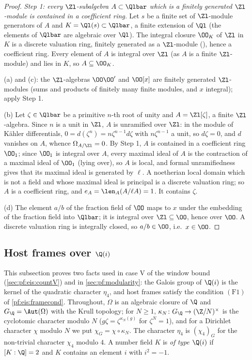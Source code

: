 \begin{proof}
\emph{Step 1: every $\Zl$-subalgebra $A\subset\Qlbar$ which is a finitely generated $\Zl$-module is contained in a coefficient ring.}
Let $s$ be a finite set of $\Zl$-module generators of $A$ and $K=\Ql(s)\subset\Qlbar$, a finite extension of $\Ql$ (the elements of
$\Qlbar$ are algebraic over $\Ql$). The integral closure $\OO_K$ of $\Zl$ in $K$ is a discrete valuation ring, finitely generated as a
$\Zl$-module (\cite[Ch.~II, \S2]{Serre1979}), hence a coefficient ring. Every element of $A$ is integral over
$\Zl$ (as $A$ is a finite $\Zl$-module) and lies in $K$, so $A\subseteq\OO_K$.

(a) and (c): the $\Zl$-algebras $\OO\OO'$ and $\OO[x]$ are finitely generated $\Zl$-modules (sums and products of finitely many finite
modules, and $x$ integral); apply Step 1.

(b) Let $\zeta\in\Qlbar$ be a primitive $n$-th root of unity and $A=\Zl[\zeta]$, a finite $\Zl$-algebra. Since $n$ is a unit in $\Zl$,
$A$ is unramified over $\Zl$: in the module of K\"ahler differentials, $0=d(\zeta^n)=n\zeta^{n-1}d\zeta$ with $n\zeta^{n-1}$ a unit, so
$d\zeta=0$, and $d$ vanishes on $A$, whence $\Omega_{A/\Zl}=0$. By Step 1, $A$ is contained in a coefficient ring $\OO_1$; since
$\OO_1$ is integral over $A$, every maximal ideal of $A$ is the contraction of a maximal ideal of $\OO_1$ (lying over), so $A$ is
local, and formal unramifiedness gives that its maximal ideal is generated by $\ell$. A noetherian local domain which is not a field and whose maximal ideal is principal is a discrete
valuation ring; so $A$ is a coefficient ring, and $e_A=\len_A(A/\ell A)=1$. It contains $\zeta$.

(d) The element $a/b$ of the fraction field of $\OO$ maps to $x$ under the embedding of the fraction field into $\Qlbar$; it is
integral over $\Zl\subseteq\OO$, hence over $\OO$. A discrete valuation ring is integrally closed, so $a/b\in\OO$, i.e.\ $x\in\OO$.
\end{proof}

\subsection{Host frames over \texorpdfstring{$\Q(i)$}{Q(i)}}\label{sec:pf:sh-misc:frames}

This subsection proves two facts used in case V of the window bound (\cref{sec:pf:eis:countV}) and in
\cref{sec:pf:modularity}: the Galois group of $\Q(i)$ is the kernel of the quadratic character $\eta_4$, and host frames satisfy the
condition $(\mathrm{F1})$ of \cref{pf:eis:framecond}. Throughout, $\Omega$ is an algebraic closure of $\Q$ and $G_\Q=\Aut(\Omega)$ with the
Krull topology; for $N\ge1$, $\kappa_N\colon G_\Q\to(\Z/N)^\times$ is the cyclotomic character modulo $N$ ($g\zeta=\zeta^{\kappa_N(g)}$ for
$\zeta^N=1$), and for a Dirichlet character $\chi$ modulo $N$ we put $\chi_G=\chi\circ\kappa_N$. The character $\eta_4$ is $(\chi_4)_G$ for the
non-trivial character $\chi_4$ modulo $4$. A number field $K$ is \emph{of type $\Q(i)$} if $[K:\Q]=2$ and $K$ contains an element $i$ with
$i^2=-1$.

